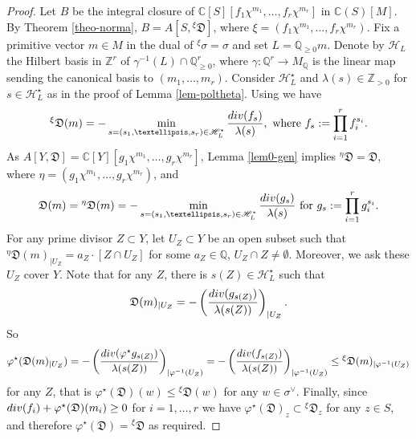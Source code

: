 \documentclass[11pt, reqno]{amsart}
\theoremstyle{plain}
\theoremstyle{definition}
\theoremstyle{remark}
\begin{document}
\begin{proof}
Let $B$ be the integral closure of $\mathbb{C}[S][f_{1}\chi^{m_{1}}, \ldots, f_{r}\chi^{m_{r}}]$ in
$\mathbb{C}(S)[M]$. By Theorem \ref{theo-norma},  $B =  A[S, {}^{\xi}\mathfrak{D}]$, where $\xi =  (f_{1}\chi^{m_{1}}, \ldots, f_{r}\chi^{m_{r}})$. Fix 
a primitive vector $m\in M$ in  the dual of ${}^{\xi}\sigma =  \sigma$ and set $L  =  \mathbb{Q}_{\geq 0}m$. Denote by $\mathscr{H}_{L}$ the Hilbert basis in $\mathbb{Z}^{r}$ of 
$\gamma^{-1}(L)\cap \mathbb{Q}_{\geq 0}^{r}$, where $\gamma: \mathbb{Q}^{r}\rightarrow M_{\mathbb{Q}}$ is the linear map sending the canonical basis to $(m_{1}, \ldots, m_{r})$. Consider 
$\mathscr{H}_{L}^{\star}$ and $\lambda(s)\in\mathbb{Z}_{>0}$ for $s\in \mathscr{H}_{L}^{\star}$  as in the proof of Lemma \ref{lem-poltheta}. 
Using  \cite[Lemma 2.11]{Lan15} we have
$${}^{\xi}\mathfrak{D}(m) =  -\min_{s = (s_{1}, \ldots, s_{r})\in \mathscr{H}_{L}^{\star}}\frac{{\rm div}(f_{s})}{\lambda(s)},
\text{ where } f_{s}:= \prod_{i = 1}^{r}f_{i}^{s_{i}}.$$
As $A[Y, \mathfrak{D}]  =  \mathbb{C}[Y][g_{1}\chi^{m_{1}}, \ldots, g_{r}\chi^{m_{r}}]$,  Lemma \ref{lem0-gen} implies  
${}^{\eta}\mathfrak{D} =  \mathfrak{D}$, where $\eta  =  (g_{1}\chi^{m_{1}}, \ldots, g_{r}\chi^{m_{r}})$, and 
$$\mathfrak{D}(m) =  {}^{\eta}\mathfrak{D}(m) =  -\min_{s = (s_{1}, \ldots, s_{r})\in \mathscr{H}_{L}^{\star}}\frac{{\rm div}(g_{s})}{\lambda(s)}\text{ for }
g_{s}:= \prod_{i = 1}^{r}g_{i}^{s_{i}}.$$
 For any prime divisor $Z\subset Y$, let $U_{Z}\subset Y$
 be an open subset such that ${}^{\eta}\mathfrak{D}(m)_{|U_{Z}} =  a_{Z}\cdot [Z\cap U_{Z}]$
 for some $a_{Z}\in\mathbb{Q}$, $U_{Z}\cap Z \neq \emptyset$. Moreover, we ask these $U_{Z}$ cover $Y$. Note that for any $Z$,
 there is $s(Z)\in \mathscr{H}_{L}^{\star}$ such that
 $$\mathfrak{D}(m)_{|U_{Z}} =  -\left(\frac{{\rm div}(g_{s(Z)})}{\lambda(s(Z))}\right)_{|U_{Z}}.$$
So
 $$\varphi^{\star}(\mathfrak{D}(m)_{|U_{Z}}) =  -\left(\frac{{\rm div}(\varphi^{\star}g_{s(Z)})}{\lambda(s(Z))}\right)_{|\varphi^{-1}(U_{Z})} =  -\left(\frac{{\rm div}(f_{s(Z)})}{\lambda(s(Z))}\right)_{|\varphi^{-1}(U_{Z})} \leq  {}^{\xi}\mathfrak{D}(m)_{|\varphi^{-1}(U_{Z})} $$
for any $Z$,
 that is $  \varphi^{\star}(\mathfrak{D})(w) \leq {}^{\xi}\mathfrak{D}(w)$ for any $w\in \sigma^{\vee}$.
Finally, since ${\rm div}(f_i) + \varphi^{\star}(\mathfrak{D})(m_{i})\geq 0$ for $i = 1, \ldots, r$ we have $\varphi^{\star}(\mathfrak{D})_{z}\subset {}^{\xi}\mathfrak{D}_{z}$ for any $z\in S$, and therefore $\varphi^{\star}(\mathfrak{D}) =   {}^{\xi}\mathfrak{D}$ as required. 
\end{proof}
\end{document}
